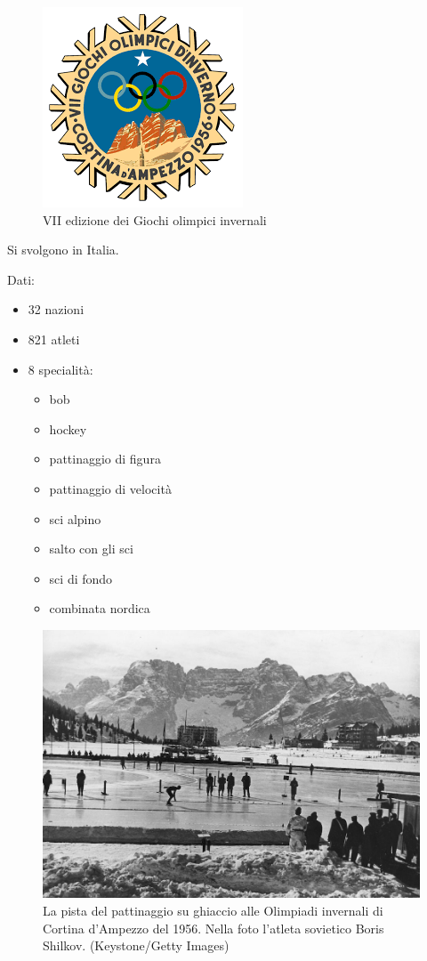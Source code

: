 \documentclass[
]{book}
\providecommand{\tightlist}{%
  \setlength{\itemsep}{0pt}\setlength{\parskip}{0pt}}
\begin{document}
\begin{figure}
\includegraphics[width=0.4\linewidth]{images/loghi/1956} \caption{VII edizione dei Giochi olimpici invernali}\label{fig:unnamed-chunk-18}
\end{figure}

Si svolgono in Italia.

Dati:

\begin{itemize}
\tightlist
\item
  32 nazioni
\item
  821 atleti
\item
  8 specialità:

  \begin{itemize}
  \tightlist
  \item
    bob
  \item
    hockey
  \item
    pattinaggio di figura
  \item
    pattinaggio di velocità
  \item
    sci alpino
  \item
    salto con gli sci
  \item
    sci di fondo
  \item
    combinata nordica
  \end{itemize}
\end{itemize}

\begin{figure}
\includegraphics[width=0.8\linewidth]{images/IlPost/1956} \caption{La pista del pattinaggio su ghiaccio alle Olimpiadi invernali di Cortina d'Ampezzo del 1956. Nella foto l'atleta sovietico Boris Shilkov. (Keystone/Getty Images)}\label{fig:unnamed-chunk-19}
\end{figure}
\end{document}

